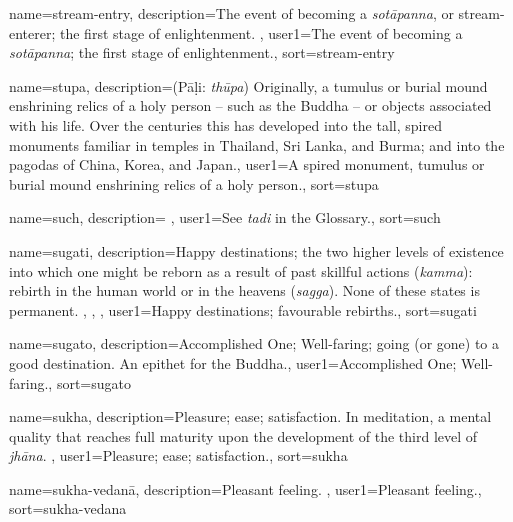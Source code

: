 {
name={stream-entry},
description={The event of becoming a \textit{sot\=apanna}, or stream-enterer; the first stage of enlightenment. \protect \seepre %
\protect {}%
\protect \seepost %
},
user1={The event of becoming a \textit{sot\=apanna}; the first stage of enlightenment.},
sort={stream-entry}
}

{
name={stupa},
description={(P\=a\d{l}i: \textit{th\=upa}) Originally, a tumulus or burial mound enshrining relics of a holy person -- such as the Buddha -- or objects associated with his life. Over the centuries this has developed into the tall, spired monuments familiar in temples in Thailand, Sri Lanka, and Burma; and into the pagodas of China, Korea, and Japan.},
user1={A spired monument, tumulus or burial mound enshrining relics of a holy person.},
sort={stupa}
}

{
name={such},
description={\nopostdesc \protect \seepre %
\protect {}%
\protect \seepost %
},
user1={See \textit{tadi} in the Glossary.},
sort={such}
}

{
name={sugati},
description={Happy destinations; the two higher levels of existence into which one might be reborn as a result of past skillful actions (\textit{kamma}): rebirth in the human world or in the heavens (\textit{sagga}). None of these states is permanent. \protect \seepre %
\protect {}, \protect {}, \protect {}%
\protect \seepost %
},
user1={Happy destinations; favourable rebirths.},
sort={sugati}
}

{
name={sugato},
description={Accomplished One; Well-faring; going (or gone) to a good destination. An epithet for the Buddha.},
user1={Accomplished One; Well-faring.},
sort={sugato}
}

{
name={sukha},
description={Pleasure; ease; satisfaction. In meditation, a mental quality that reaches full maturity upon the development of the third level of \textit{jh\=ana}. \protect \seepre %
\protect {}%
\protect \seepost %
},
user1={Pleasure; ease; satisfaction.},
sort={sukha}
}

{
name={sukha-vedan\=a},
description={Pleasant feeling. \protect \seepre %
\protect {}%
\protect \seepost %
},
user1={Pleasant feeling.},
sort={sukha-vedana}
}

